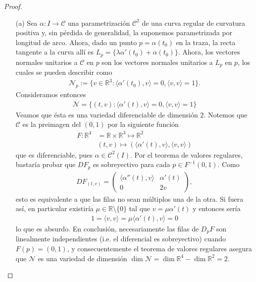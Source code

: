 \documentclass[11pt]{article}
\newcommand{\R}{\mathbb{R}}
\newcommand{\ip}[2]{\langle #1 , #2 \rangle}
\begin{document}
\begin{proof}
\hspace{0.5pt}
\begin{itemize}
\item[(a)] Sea $\alpha : I \to \mathcal{C}$ una parametrizaci\'on $\mathcal{C}^2$ de una curva regular de curvatura positiva y, sin p\'erdida de generalidad, la suponemos parametrizada por longitud de arco. Ahora, dado un punto $p = \alpha(t_0)$ en la traza, la recta tangente a la curva all\'i es $L_p = \{\lambda \alpha'(t_0) + \alpha(t_0)\}$. Ahora, los vectores normales unitarios a $\mathcal{C}$ en $p$ son los vectores normales unitarios a $L_p$ en $p$, los cuales se pueden describir como
\begin{align*}
\mathcal{N}_p := \{v \in \R^3 : \ip{\alpha'(t_0)}{v} = 0, \ip{v}{v} = 1 \}.
\end{align*}
Consideramos entonces
\begin{align*}
\mathcal{N} = \{(t,v) : \ip{\alpha'(t)}{v} = 0, \ip{v}{v} = 1\}
\end{align*}
Veamos que \'esta es una variedad diferenciable de dimensi\'on $2$. Notemos que $\mathcal{C}$ es la preimagen del $(0,1)$ por la siguiente funci\'on
\begin{align*}
F : \R^4& = \R \times \R^3 \mapsto \R^2 \\
& (t,v) \mapsto (\ip{\alpha'(t)}{v},\ip{v}{v})
\end{align*}
que es diferenciable, pues $\alpha \in \mathcal{C}^2(I)$. Por el teorema de valores regulares, bastar\'ia probar que $DF_p$ es sobreyectivo para cada $p \in F^{-1}(0,1)$. Como
\begin{align*}
DF_{(t,v)} = \begin{pmatrix}
\ip{\alpha''(t)}{v} & \alpha'(t) \\
0 & 2v
\end{pmatrix},
\end{align*}
esto es equivalente a que las filas no sean m\'ultiplos una de la otra. Si fuera as\'i, en particular existir\'ia $\mu \in \R \setminus \{0\}$ tal que $v = \mu \alpha'(t)$ y entonces ser\'ia
\begin{align*}
1 = \ip{v}{v} = \mu \ip{\alpha'(t)}{v} = 0
\end{align*}
lo que es absurdo. En conclusi\'on, necesariamente las filas de $D_pF$ son linealmente independientes (i.e. el diferencial es sobreyectivo) cuando $F(p) = (0,1)$, y consecuentemente el teorema de valores regulares asegura que $\mathcal{N}$ es una variedad de dimensi\'on $\dim \mathcal{N} = \dim \R^4 - \dim \R^2 = 2$.

\end{itemize}
\end{proof}
\end{document}
